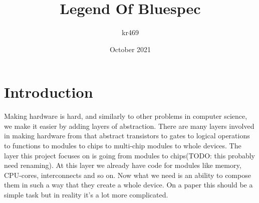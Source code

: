 \documentclass[14pt]{report}
\title{Legend Of Bluespec}
\author{kr469 }
\date{October 2021}
\begin{document}
\maketitle
\tableofcontents

\chapter{Introduction}

Making hardware is hard, and similarly to other problems in computer science, we make it easier by adding layers of abstraction. There are many layers involved in making hardware from that abstract transistors to gates to logical operations to functions to modules to chips to multi-chip modules to whole devices. The layer this project focuses on is going from modules to chips(TODO: this probably need renaming). At this layer we already have code for modules like memory, CPU-cores, interconnects and so on. Now what we need is an ability to compose them in such a way that they create a whole device. On a paper this should be a simple task but in reality it's a lot more complicated.
\end{document}
